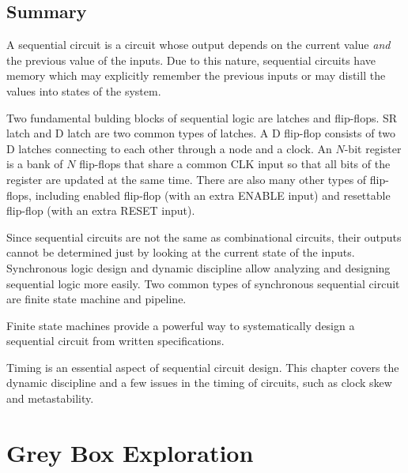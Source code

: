 \documentclass[12pt]{article}
\begin{document}
\subsection{Summary}

A sequential circuit is a circuit whose output depends on the current value \textit{and} the previous value of the inputs. Due to this nature, sequential circuits have memory which may explicitly remember the previous inputs or may distill the values into states of the system.

Two fundamental bulding blocks of sequential logic are latches and flip-flops. SR latch and D latch are two common types of latches. A D flip-flop consists of two D latches connecting to each other through a node and a clock. An $N$-bit register is a bank of $N$ flip-flops that share a common CLK input so that all bits of the register are updated at the same time. There are also many other types of flip-flops, including enabled flip-flop (with an extra ENABLE input) and resettable flip-flop (with an extra RESET input).

Since sequential circuits are not the same as combinational circuits, their outputs cannot be determined just by looking at the current state of the inputs. Synchronous logic design and dynamic discipline allow analyzing and designing sequential logic more easily. Two common types of synchronous sequential circuit are finite state machine and pipeline.

Finite state machines provide a powerful way to systematically design a sequential circuit from written specifications.

Timing is an essential aspect of sequential circuit design. This chapter covers the dynamic discipline and a few issues in the timing of circuits, such as clock skew and metastability.

\section{Grey Box Exploration}
\end{document}
